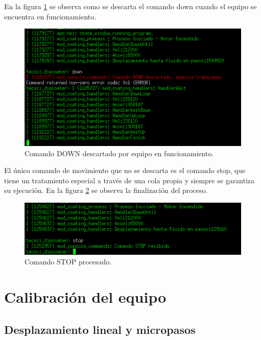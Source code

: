 En la figura \ref{fig:consola_comando_ok} se observa como se descarta el comando down cuando el equipo se encuentra en funcionamiento.

\begin{figure}[h!]
	\centering
	\includegraphics[width=1\textwidth]{./Figures/consola_4.png}
	\caption{Comando DOWN descartado por equipo en funcionamiento.}
	\label{fig:consola_comando_ok}
\end{figure}

El único comando de movimiento que no se descarta es el comando stop, que tiene un tratamiento especial a través de una cola propia y siempre se garantiza su ejecución. En la figura \ref{fig:consola_comando_false} se observa la finalización del proceso.

\begin{figure}[h!]
	\centering
	\includegraphics[width=1\textwidth]{./Figures/consola_5.png}
	\caption{Comando STOP procesado.}
	\label{fig:consola_comando_false}
\end{figure}
 
  
\section{Calibración del equipo}
\label{sec:calibración}
\subsection{Desplazamiento lineal y micropasos}

